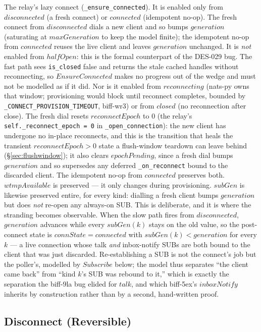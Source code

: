 \documentclass[a4paper,10pt,fleqn]{article}
\begin{document}
The relay's lazy connect (\texttt{\_ensure\_connected}).  It is
enabled only from $disconnected$ (a fresh connect) or $connected$
(idempotent no-op).  The fresh connect from $disconnected$ dials a
new client and so bumps $generation$ (saturating at
$maxGeneration$ to keep the model finite); the idempotent no-op
from $connected$ reuses the live client and leaves $generation$
unchanged.  It is \emph{not} enabled from $halfOpen$:
this is the formal counterpart of the DES-029 bug.  The fast path
sees \texttt{is\_closed} false and returns the stale cached
handles without reconnecting, so $EnsureConnected$ makes no
progress out of the wedge and must not be modelled as if it did.
Nor is it enabled from $reconnecting$ (nats-py owns that window;
provisioning would block until reconnect completes, bounded by
\texttt{\_CONNECT\_PROVISION\_TIMEOUT}, biff-wr3) or from $closed$
(no reconnection after close).  The fresh dial resets $reconnectEpoch$
to $0$ (the relay's \texttt{self.\_reconnect\_epoch = 0} in
\texttt{\_open\_connection}): the new client has undergone no in-place
reconnects, and this is the transition that heals the transient
$reconnectEpoch > 0$ state a flush-window teardown can leave behind
(\S\ref{sec:flushwindow}); it also clears $epochPending$, since a fresh
dial bumps $generation$ and so supersedes any deferred
\texttt{\_on\_reconnect} bound to the discarded client.  The idempotent
no-op from $connected$ preserves both.  $wtmpAvailable$ is preserved ---
it only changes during provisioning.  $subGen$ is likewise preserved
entire, for every kind: dialling a fresh client bumps $generation$ but does
\emph{not} re-open any always-on SUB.  This is deliberate, and it is where
the stranding becomes observable.  When the slow path fires from
$disconnected$, $generation$ advances while every $subGen(k)$ stays on the
old value, so the post-connect state is $connState = connected$ with
$subGen(k) < generation$ for every $k$ --- a live connection whose talk
\emph{and} inbox-notify SUBs are both bound to the client that was just
discarded.  Re-establishing a SUB is not the connect's job but the
poller's, modelled by $Subscribe$ below; the model thus separates ``the
client came back'' from ``kind $k$'s SUB was rebound to it,'' which is
exactly the separation the biff-9la bug elided for $talk$, and which
biff-5ex's $inboxNotify$ inherits by construction rather than by a second,
hand-written proof.

\subsection{Disconnect (Reversible)}
\end{document}
